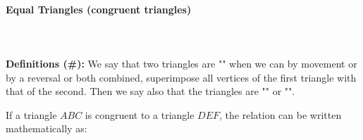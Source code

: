 	\paragraph{Equal Triangles (congruent triangles)}\mbox{}\\\\
	\textbf{Definitions (\#\mydef):} We say that two triangles are "" when we can by movement or by a reversal or both combined, superimpose all vertices of the first triangle with that of the second. Then we say also that the triangles are "" or "".

	If a triangle $ABC$ is congruent to a triangle $DEF$, the relation can be written mathematically as:
	

